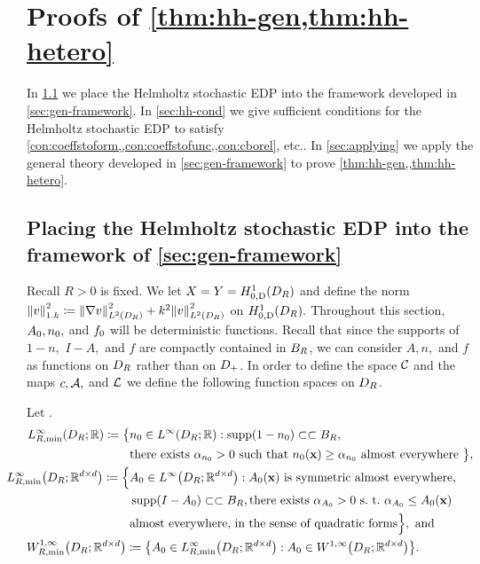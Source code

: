 \section{Proofs of \cref{thm:hh-gen,thm:hh-hetero}}\label{sec:hhproof}
In \cref{sec:placing} we place the Helmholtz stochastic EDP into the framework developed in \cref{sec:gen-framework}. In \cref{sec:hh-cond} we give sufficient conditions for the Helmholtz stochastic EDP to satisfy \cref{con:coeffstoform,,con:coeffstofunc,,con:cborel}, etc.. In \cref{sec:applying} we apply the general theory developed in \cref{sec:gen-framework} to prove \cref{thm:hh-gen,,thm:hh-hetero}.

\subsection{Placing the Helmholtz stochastic EDP into the framework of \cref{sec:gen-framework}}\label{sec:placing}
Recall $R>0$ is fixed. We let $X=Y=\HozDDR$ and define the norm $\NW{v}^2 \de \NLtDR{\grad v}^2 + k^2 \NLtDR{v}^2$ on $\HozDDR.$ Throughout this section, $A_{0},n_{0},$ and $f_{0}$ will be deterministic functions. Recall that since the supports of $1-n,$ $I-A,$ and $f$ are compactly contained in $B_{R}$, we can consider $A, n,$ and $f$ as functions on $D_{R}$ rather than on $D_{+}$. In order to define the space $\mathcal C$ and the maps $c,\mathcal A,$ and $\mathcal L$ we define the following function spaces on $D_{R}$.

\label{def:compsuppspace}
Let
\beqs
\LtRDR \de \set{\fz \in \LtDR \st \supp\mleft(\fz\mright) \compcont \BR}.
\eeqs
\begin{align*}
\LiRminDRRR \de \big\{&\nz \in \LiDRRR \st\supp\mleft(1-\nz\mright) \compcont \BR,\\
&\text{there exists } \alphanz > 0 \text{ such that } \nz(\bx) \geq \alphanz \text{ almost everywhere }\big\},\\
\hspace{-3cm}\LiRminDRRRdtd \de \Big\{&\Az \in \LiDRRRdtd \st\Az(\bx) \text{ is symmetric almost everywhere,}\\
&\supp\mleft(I-\Az\mright) \compcont \BR, \text{there exists } \alphaAz>0 \text{ s.~t.~}\alphaAz \leq \Az(\bx)\\
&\text{almost everywhere, in the sense of quadratic forms}\Big\},\text{ and}\\
&\hspace{-3cm}\WoiRminDRRRdtd \de \set{\Az \in \LiRminDRRRdtd \st\Az \in \WoiDRRRdtd}.
\end{align*}
\ede

